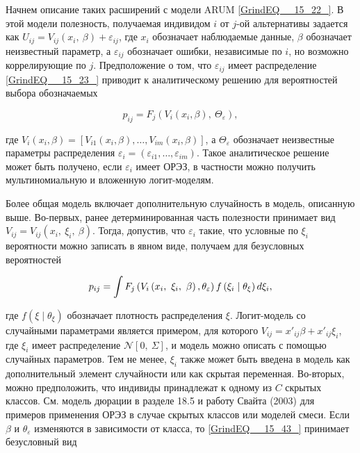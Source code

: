 Начнем описание таких расширений с модели ARUM \eqref{GrindEQ__15_22_}. В этой модели полезность, получаемая индивидом $i$ от $j$-ой альтернативы задается как $U_{ij}=V_{ij}\left(x_i,\ \beta \right)+{\varepsilon }_{ij}$, где $x_i$ обозначает наблюдаемые данные, $\beta $ обозначает неизвестный параметр, а ${\varepsilon }_{ij}$ обозначает ошибки, независимые по $i$, но возможно коррелирующие по $j$. Предположение о том, что ${\varepsilon }_{ij}$ имеет распределение \eqref{GrindEQ__15_23_} приводит к аналитическому решению для вероятностей выбора обозначаемых

\[p_{ij}=F_j\left(V_i\left(x_i,\beta \right),\ {\Theta }_{\varepsilon }\right),\] 

где $V_i\left(x_i,\beta \right)=[V_{i1}\left(x_i,\beta \right),\dots ,V_{im}\left(x_i,\beta \right)]$, а ${\Theta }_{\varepsilon }$ обозначает неизвестные параметры распределения ${\varepsilon }_i=\left({\varepsilon }_{i1},\dots ,{\varepsilon }_{im}\right).$  Такое аналитическое решение может быть получено, если ${\varepsilon }_i$ имеет ОРЭЗ, в частности можно получить мультиномиальную и вложенную логит-моделям.

Более общая модель включает дополнительную случайность в модель, описанную выше. Во-первых, ранее детерминированная часть полезности принимает вид $V_{ij}=V_{ij}\left(x_i,\ {\xi }_i,\ \beta \right)$. Тогда, допустив, что ${\varepsilon }_i$ такие, что условные по ${\xi }_i$ вероятности можно записать в явном виде, получаем для безусловных вероятностей

\begin{equation} \label{GrindEQ__15_43_} p_{ij}=\int{F_j\left(V_i\left(x_i,\ {\xi }_i,\ \beta \right),{\theta }_{\varepsilon }\right)f\left({\xi }_i\mathrel{\left|\vphantom{{\xi }_i {\theta }_{\xi }}\right.\kern-\nulldelimiterspace}{\theta }_{\xi }\right)d{\xi }_i}, \end{equation} 

где $f\left(\xi \mid \theta_{\xi}\right)$ обозначает плотность распределения $\xi $. Логит-модель со случайными параметрами является примером, для которого $V_{ij}=x'_{ij}\beta +x'_{ij}{\xi }_i$, где ${\xi }_i$ имеет распределение ${\mathcal N}[0,\ \Sigma ]$, и модель можно описать с помощью случайных параметров. 
Тем не менее, ${\xi }_i$ также может быть введена в модель как дополнительный элемент случайности или как скрытая переменная. Во-вторых, можно предположить, что индивиды принадлежат к одному из $C$ скрытых классов. См. модель дюрации в разделе 18.5 и  работу Свайта (2003) для примеров применения ОРЭЗ в случае скрытых классов или моделей смеси. Если $\beta $ и ${\theta }_{\varepsilon }$ изменяются в зависимости от класса, то \eqref{GrindEQ__15_43_}  принимает безусловный вид

